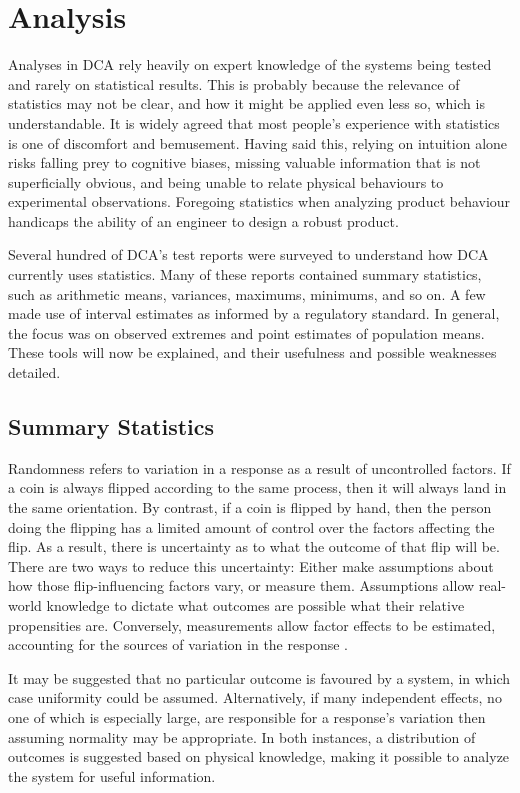 \documentclass[11pt,a4paper,article]{memoir} %
\begin{document}
\vspace{48pt}
\section{Analysis}
Analyses in DCA rely heavily on expert knowledge of the systems being tested and rarely on statistical results. This is probably because the relevance of statistics may not be clear, and how it might be applied even less so, which is understandable. It is widely agreed that most people's experience with statistics is one of discomfort and bemusement. Having said this, relying on intuition alone risks falling prey to cognitive biases, missing valuable information that is not superficially obvious, and being unable to relate physical behaviours to experimental observations. Foregoing statistics when analyzing product behaviour handicaps the ability of an engineer to design a robust product.
\par
Several hundred of DCA's test reports were surveyed to understand how DCA currently uses statistics. Many of these reports contained summary statistics, such as arithmetic means, variances, maximums, minimums, and so on. A few made use of interval estimates as informed by a regulatory standard. In general, the focus was on observed extremes and point estimates of population means. These tools will now be explained, and their usefulness and possible weaknesses detailed.
\par
\subsection*{Summary Statistics}
 Randomness refers to variation in a response as a result of uncontrolled factors. If a coin is always flipped according to the same process, then it will always land in the same orientation. By contrast, if a coin is flipped by hand, then the person doing the flipping has a limited amount of control over the factors affecting the flip. As a result, there is uncertainty as to what the outcome of that flip will be. There are two ways to reduce this uncertainty: Either make assumptions about how those flip-influencing factors vary, or measure them. Assumptions allow real-world knowledge to dictate what outcomes are possible what their relative propensities are. Conversely, measurements allow factor effects to be estimated, accounting for the sources of variation in the response \cite{jaynes2003probability}.
 
 It may be suggested that no particular outcome is favoured by a system, in which case uniformity could be assumed. Alternatively, if many independent effects, no one of which is especially large, are responsible for a response's variation then assuming normality may be appropriate. In both instances, a distribution of outcomes is suggested based on physical knowledge, making it possible to analyze the system for useful information.
 
\end{document}
